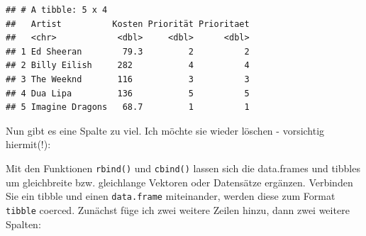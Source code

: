 \documentclass[
  ngerman,
]{book}
\newenvironment{Shaded}{\begin{snugshade}}{\end{snugshade}}
\newcommand{\CommentTok}[1]{\textcolor[rgb]{0.56,0.35,0.01}{\textit{#1}}}
\newcommand{\ConstantTok}[1]{\textcolor[rgb]{0.56,0.35,0.01}{#1}}
\newcommand{\DecValTok}[1]{\textcolor[rgb]{0.00,0.00,0.81}{#1}}
\newcommand{\FunctionTok}[1]{\textcolor[rgb]{0.13,0.29,0.53}{\textbf{#1}}}
\newcommand{\NormalTok}[1]{#1}
\newcommand{\OtherTok}[1]{\textcolor[rgb]{0.56,0.35,0.01}{#1}}
\newcommand{\SpecialCharTok}[1]{\textcolor[rgb]{0.81,0.36,0.00}{\textbf{#1}}}
\begin{document}
\begin{Shaded}
\end{Shaded}

\begin{verbatim}
## # A tibble: 5 x 4
##   Artist          Kosten Priorität Prioritaet
##   <chr>            <dbl>     <dbl>      <dbl>
## 1 Ed Sheeran        79.3         2          2
## 2 Billy Eilish     282           4          4
## 3 The Weeknd       116           3          3
## 4 Dua Lipa         136           5          5
## 5 Imagine Dragons   68.7         1          1
\end{verbatim}

Nun gibt es eine Spalte zu viel. Ich möchte sie wieder löschen - vorsichtig hiermit(!):

\begin{Shaded}
\end{Shaded}

Mit den Funktionen \texttt{rbind()} und \texttt{cbind()} lassen sich die data.frames und tibbles um gleichbreite bzw. gleichlange Vektoren oder Datensätze ergänzen. Verbinden Sie ein tibble und einen \texttt{data.frame} miteinander, werden diese zum Format \texttt{tibble} coerced. Zunächst füge ich zwei weitere Zeilen hinzu, dann zwei weitere Spalten:
\end{document}
